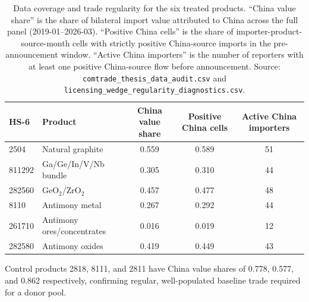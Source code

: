 \begin{table}[H]
\centering
\caption{Data coverage and trade regularity for the six treated products.
``China value share'' is the share of bilateral import value attributed to China
across the full panel (2019-01--2026-03). ``Positive China cells'' is the share
of importer-product-source-month cells with strictly positive China-source
imports in the pre-announcement window. ``Active China importers'' is the number
of reporters with at least one positive China-source flow before announcement.
Source: \texttt{comtrade\_thesis\_data\_audit.csv} and
\texttt{licensing\_wedge\_regularity\_diagnostics.csv}.}
\label{tab:coverage}
\footnotesize
\begin{tabular}{llccc}
\toprule
HS-6 & Product & China value share & Positive China cells & Active China importers \\
\midrule
2504   & Natural graphite                & 0.559 & 0.589 & 51 \\
811292 & Ga/Ge/In/V/Nb bundle           & 0.305 & 0.310 & 44 \\
282560 & GeO$_2$/ZrO$_2$                 & 0.457 & 0.477 & 48 \\
8110   & Antimony metal                  & 0.267 & 0.292 & 44 \\
261710 & Antimony ores/concentrates      & 0.016 & 0.019 & 12 \\
282580 & Antimony oxides                 & 0.419 & 0.449 & 43 \\
\bottomrule
\end{tabular}

\smallskip
\footnotesize Control products 2818, 8111, and 2811 have China value shares of
0.778, 0.577, and 0.862 respectively, confirming regular, well-populated
baseline trade required for a donor pool.
\end{table}
